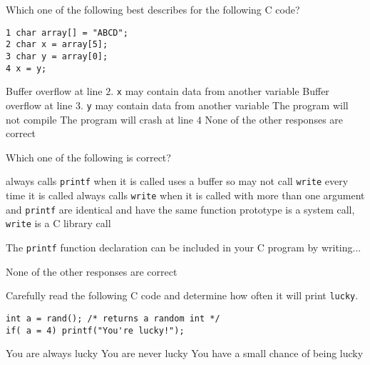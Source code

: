 \variant
Which one of the following best describes for the following C code?
\begin{verbatim}
1 char array[] = "ABCD";
2 char x = array[5];
3 char y = array[0];
4 x = y;
\end{verbatim}
\begin{answers}
\correctanswer Buffer overflow at line $2$. {\tt x} may contain data from another variable
\answer Buffer overflow at line $3$. {\tt y} may contain data from another variable 
\answer The program will not compile
\answer The program will crash at line $4$ 
\answer None of the other responses are correct
\end{answers}
\begin{solution}
\end{solution}


\variant
Which one of the following is correct?
\begin{answers} 
 always calls {\tt printf} when it is called
 uses a buffer so may not call {\tt write} every time it is called
 always calls {\tt write} when it is called with more than one argument
 and {\tt printf} are identical and have the same function prototype
 is a system call, {\tt write} is a C library call
\end{answers}
\begin{solution}
\end{solution}


\variant
The {\tt printf} function declaration can be included in your C program by writing...
\begin{answers}
\answer None of the other responses are correct
\end{answers}
\begin{solution}
\end{solution}


\variant
Carefully read the following C code and determine how often it will print {\tt lucky}.
\begin{verbatim}
int a = rand(); /* returns a random int */
if( a = 4) printf("You're lucky!");
\end{verbatim}
\begin{answers}
\correctanswer You are always lucky
\answer You are never lucky
\answer You have a small chance of being lucky
\end{answers}
\begin{solution}
\end{solution}

